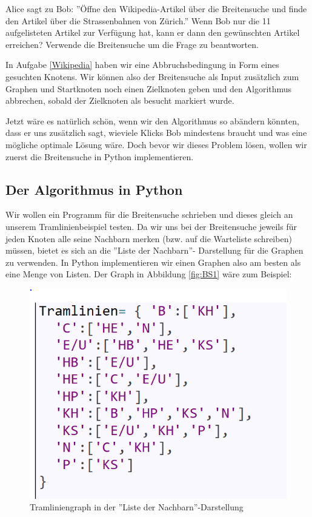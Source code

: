 \begin{aufgabe} \label{Wikipedia}
Alice sagt zu Bob: ''Öffne den Wikipedia-Artikel über die Breitensuche und finde den Artikel über die Strassenbahnen von Zürich.'' Wenn Bob nur die 11 aufgelisteten Artikel zur Verfügung hat, kann er dann den gewünschten Artikel erreichen? Verwende die Breitensuche um die Frage zu beantworten.
\end{aufgabe}

In Aufgabe \ref{Wikipedia} haben wir eine Abbruchsbedingung in Form eines gesuchten Knotens. Wir können also der Breitensuche als Input zusätzlich zum Graphen und Startknoten noch einen Zielknoten geben und den Algorithmus abbrechen, sobald der Zielknoten als besucht markiert wurde.

Jetzt wäre es natürlich schön, wenn wir den Algorithmus so abändern könnten, dass er uns zusätzlich sagt, wieviele Klicks Bob mindestens braucht und was eine mögliche optimale Lösung wäre. Doch bevor wir dieses Problem lösen, wollen wir zuerst die Breitensuche in Python implementieren.

\subsection{Der Algorithmus in Python}
Wir wollen ein Programm für die Breitensuche schrieben und dieses gleich an unserem Tramlinienbeispiel testen.
Da wir uns bei der Breitensuche jeweils für jeden Knoten alle seine Nachbarn merken (bzw. auf die Warteliste schreiben) müssen, bietet es sich an die ''Liste der Nachbarn''- Darstellung für die Graphen zu verwenden.
In Python implementieren wir einen Graphen also am besten als eine Menge von Listen. Der Graph in Abbildung \ref{fig:BS1} wäre zum Beispiel:

\begin{figure}[H]
    \centering
    \includegraphics[scale=0.8]{Pictures/ListeDerNachbarn.PNG}
    \caption{Tramliniengraph in der ''Liste der Nachbarn''-Darstellung}
    \label{fig:Tram2}
\end{figure}

